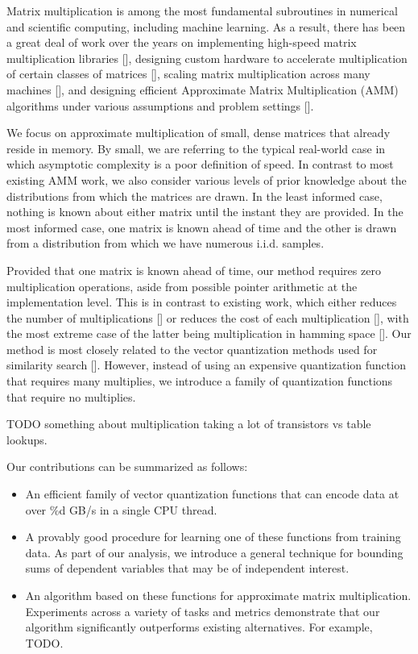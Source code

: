 
Matrix multiplication is among the most fundamental subroutines in numerical and scientific computing, including machine learning. As a result, there has been a great deal of work over the years on implementing high-speed matrix multiplication libraries [], designing custom hardware to accelerate multiplication of certain classes of matrices [], scaling matrix multiplication across many machines [], and designing efficient Approximate Matrix Multiplication (AMM) algorithms under various assumptions and problem settings [].

We focus on approximate multiplication of small, dense matrices that already reside in memory. By small, we are referring to the typical real-world case in which asymptotic complexity is a poor definition of speed. In contrast to most existing AMM work, we also consider various levels of prior knowledge about the distributions from which the matrices are drawn. In the least informed case, nothing is known about either matrix until the instant they are provided. In the most informed case, one matrix is known ahead of time and the other is drawn from a distribution from which we have numerous i.i.d. samples.

Provided that one matrix is known ahead of time, our method requires zero multiplication operations, aside from possible pointer arithmetic at the implementation level. This is in contrast to existing work, which either reduces the number of multiplications [] or reduces the cost of each multiplication [], with the most extreme case of the latter being multiplication in hamming space [].
Our method is most closely related to the vector quantization methods used for similarity search []. However, instead of using an expensive quantization function that requires many multiplies, we introduce a family of quantization functions that require no multiplies.

TODO something about multiplication taking a lot of transistors vs table lookups.

Our contributions can be summarized as follows:
\begin{itemize}
    \item An efficient family of vector quantization functions that can encode data at over \%d GB/s in a single CPU thread.
    \item A provably good procedure for learning one of these functions from training data. As part of our analysis, we introduce a general technique for bounding sums of dependent variables that may be of independent interest.
    \item An algorithm based on these functions for approximate matrix multiplication. Experiments across a variety of tasks and metrics demonstrate that our algorithm significantly outperforms existing alternatives. For example, TODO.
\end{itemize}

